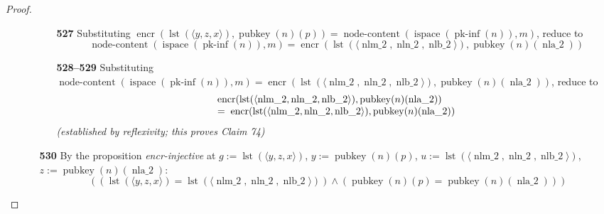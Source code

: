 \documentclass[11pt]{article}
\theoremstyle{plain}
\begin{document}
\begin{proof}
\begin{itemize}[leftmargin=2.8em, itemsep=4pt, parsep=1pt]
\begin{itemize}[leftmargin=2.8em, itemsep=4pt, parsep=1pt]
  \begin{itemize}[leftmargin=2.8em, itemsep=4pt, parsep=1pt]
  \item[\textbf{527}] Substituting $\operatorname{encr}(\operatorname{lst}(\langle y, z, x \rangle), \operatorname{pubkey}(n)(p)) = \operatorname{node\text{-}content}(\operatorname{ispace}(\operatorname{pk\text{-}inf}(n)), m)$, reduce to
\begin{equation*}
\operatorname{node\text{-}content}(\operatorname{ispace}(\operatorname{pk\text{-}inf}(n)), m) = \operatorname{encr}(\operatorname{lst}(\langle \operatorname{nlm\_2}, \operatorname{nln\_2}, \operatorname{nlb\_2} \rangle), \operatorname{pubkey}(n)(\operatorname{nla\_2}))
\end{equation*}

  \item[\textbf{528--529}] Substituting $\operatorname{node\text{-}content}(\operatorname{ispace}(\operatorname{pk\text{-}inf}(n)), m) = \operatorname{encr}(\operatorname{lst}(\langle \operatorname{nlm\_2}, \operatorname{nln\_2}, \operatorname{nlb\_2} \rangle), \operatorname{pubkey}(n)(\operatorname{nla\_2}))$, reduce to
\begin{equation*}
\begin{array}{@{}l@{}} \operatorname{encr}(\operatorname{lst}(\langle \operatorname{nlm\_2}, \operatorname{nln\_2}, \operatorname{nlb\_2} \rangle), \operatorname{pubkey}(n)(\operatorname{nla\_2})) \\ =\; \operatorname{encr}(\operatorname{lst}(\langle \operatorname{nlm\_2}, \operatorname{nln\_2}, \operatorname{nlb\_2} \rangle), \operatorname{pubkey}(n)(\operatorname{nla\_2})) \end{array}
\end{equation*}
  \emph{(established by reflexivity; this proves Claim 74)}
  \end{itemize}
  \item[\textbf{530}] By the proposition \emph{encr-injective} at $g := \operatorname{lst}(\langle y, z, x \rangle)$, $y := \operatorname{pubkey}(n)(p)$, $u := \operatorname{lst}(\langle \operatorname{nlm\_2}, \operatorname{nln\_2}, \operatorname{nlb\_2} \rangle)$, $z := \operatorname{pubkey}(n)(\operatorname{nla\_2})$:
\begin{equation*}
((\operatorname{lst}(\langle y, z, x \rangle) = \operatorname{lst}(\langle \operatorname{nlm\_2}, \operatorname{nln\_2}, \operatorname{nlb\_2} \rangle)) \wedge (\operatorname{pubkey}(n)(p) = \operatorname{pubkey}(n)(\operatorname{nla\_2})))
\end{equation*}


\end{itemize}
\end{itemize}
\end{proof}
\end{document}
